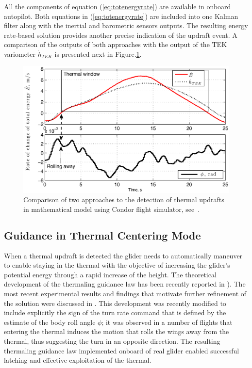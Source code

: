 \documentclass{ifacconf}
\newcommand{\squeezeup}{\vspace{-2.0mm}}
\begin{document}
All the components of equation (\ref{eq:totenergyrate}) are available in onboard
autopilot. Both equations in (\ref{eq:totenergyrate}) are included into one Kalman filter
along with the inertial and barometric sensors outputs. The resulting energy rate-based
solution provides another precise indication of the updraft event. A comparison of the
outputs of both approaches with the output  of the TEK variometer $\dot{h}_{TEK}$ is
presented next in Figure.\ref{fig:ThermalDetection}.
\begin{figure}[thpb]
  \centering
  \includegraphics[scale=0.45]{Figures/TEK_Bank.eps}
  \caption{Comparison of two approaches to the detection of thermal updrafts in mathematical model
  using Condor flight simulator, see~\cite{Condor:2013:Online}. }
  \label{fig:ThermalDetection}
\end{figure}

\subsection{Guidance in Thermal Centering Mode}
\label{subsec:ThermGuidance}
\squeezeup

When a thermal updraft is detected the glider needs to automatically maneuver to enable
staying in the thermal with the objective of increasing the glider's potential energy
through a rapid increase of the height. The theoretical development of the thermaling
guidance law has been recently reported in \cite{AKlass_JGCD:2012}). The most recent
experimental results and findings that motivate further refinement of the solution were
discussed in \cite{AKlass_CDC:2012}. This development was recently modified to include
explicitly the sign of the turn rate command that is defined by the estimate of the body
roll angle $\phi$; it was observed in a number of flights that entering the thermal
induces the motion that rolls the wings away from the thermal, thus suggesting the turn
in an opposite direction. The resulting thermaling guidance law implemented onboard of
real glider enabled successful latching and effective exploitation of the thermal.
\end{document}
